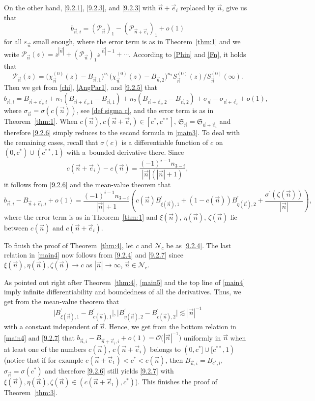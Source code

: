 \documentclass[pdftex]{sigma}
\numberwithin{equation}{section}
\newcommand{\n}{{\vec n}}
\newcommand{\RS}{\boldsymbol{\mathfrak{S}}}
\begin{document}
On the other hand, \eqref{9.2.1}, \eqref{9.2.3}, and \eqref{9.2.3} with $ \n+\vec e_i $ replaced by $ \n $, give us that
\begin{equation}
\label{9.2.5}
b_{\n,i} = (\mathcal P_\n)_1 - (\mathcal P_{\n+\vec e_i})_1 + o(1)
\end{equation}
for all $ \varepsilon_\n $ small enough, where the error term is as in Theorem~\ref{thm:1} and we write $ \mathcal P_\n(z) = z^{|\n|} + (\mathcal P_\n)_1 z^{|\n|-1} + \cdots $. According to \eqref{Phin} and \eqref{Fn}, it holds that
\[
\mathcal P_\n(z) = \bigl( \chi_\n^{(0)}(z) -B_{\n,1} \bigr)^{n_1} \bigl( \chi_\n^{(0)}(z)-B_{\n,2} \bigr)^{n_2} S_\n^{(0)}(z) / S_\n^{(0)}(\infty).
\]
Then we get from \eqref{chi}, \eqref{AngPar1}, and \eqref{9.2.5} that
\begin{equation}
\label{9.2.6}
b_{\n,i} = B_{\n+\vec e_i,i} + n_1( B_{\n+\vec e_i,1} - B_{\n,1} ) + n_2( B_{\n+\vec e_i,2} - B_{\n,2} ) + \sigma_\n - \sigma_{\n+\vec e_i} + o(1),
\end{equation}
where $ \sigma_\n=\sigma(c(\n))$, see \eqref{def sigma c}, and the error term is as in Theorem~\ref{thm:1}. When $ c(\n),c(\n+\vec e_i)\in[c^*,c^{**}] $, $ \RS_\n=\RS_{\n+\vec e_i} $ and therefore \eqref{9.2.6} simply reduces to the second formula in \eqref{main3}. To deal with the remaining cases, recall that $ \sigma(c) $ is a differentiable function of $ c $ on $ (0,c^*)\cup(c^{**},1) $ with a~bounded derivative there. Since
\[
c(\n+\vec e_i) - c(\n) = \frac{(-1)^{i-1}n_{3-i}}{|\n|(|\n|+1)},
\]
it follows from \eqref{9.2.6} and the mean-value theorem that
\begin{equation}
\label{9.2.7}
b_{\n,i} - B_{\n+\vec e_i,i} + o(1) = \frac{(-1)^{i-1}n_{3-i}}{|\n|+1}\left( c(\n)B^\prime_{\xi(\n),1} + (1-c(\n))B_{\eta(\n),2}^\prime + \frac{\sigma^\prime(\zeta(\n))}{|\n|}\right),
\end{equation}
where the error term is as in Theorem~\ref{thm:1} and $ \xi(\n)$, $\eta(\n)$, $\zeta(\n) $ lie between $ c(\n) $ and $ c(\n+\vec e_i) $.

To finish the proof of Theorem~\ref{thm:4}, let $ c $ and $ \mathcal N_c $ be as \eqref{9.2.4}. The last relation in \eqref{main4} now follows from \eqref{9.2.4} and \eqref{9.2.7} since $ \xi(\n),\eta(\n),\zeta(\n) \to c $ as $ |\n|\to\infty $, $ \n\in\mathcal N_c $.

As pointed out right after Theorem~\ref{thm:4}, \eqref{main5} and the top line of \eqref{main4} imply infinite differentiability and boundedness of all the derivatives. Thus, we get from the mean-value theorem that
\[
\big| B^\prime_{\xi(\n),1} - B^\prime_{c(\n),1} \big|,\big| B^\prime_{\eta(\n),2} - B^\prime_{c(\n),2} \big| \lesssim |\n|^{-1}
\]
with a constant independent of $ \n $. Hence, we get from the bottom relation in \eqref{main4} and \eqref{9.2.7} that
$
b_{\n,i} - B_{\n+\vec e_i,i} + o(1) = \mathcal O\bigl(|\n|^{-1}\bigr)
$
uniformly in $ \n $ when at least one of the numbers $ c(\n)$, $c(\n+\vec e_i) $ belongs to $ (0,c^*] \cup [c^{**},1) $ (notice that if for example $ c(\n+\vec e_1)<c^*<c(\n) $, then $ B_{\n,i}=B_{c^*,i} $, $ \sigma_\n=\sigma(c^*) $ and therefore \eqref{9.2.6} still yields \eqref{9.2.7} with $ \xi(\n),\eta(\n),\zeta(\n) \in (c(\n+\vec e_1),c^*) $). This finishes the proof of Theorem~\ref{thm:3}.
\end{document}
